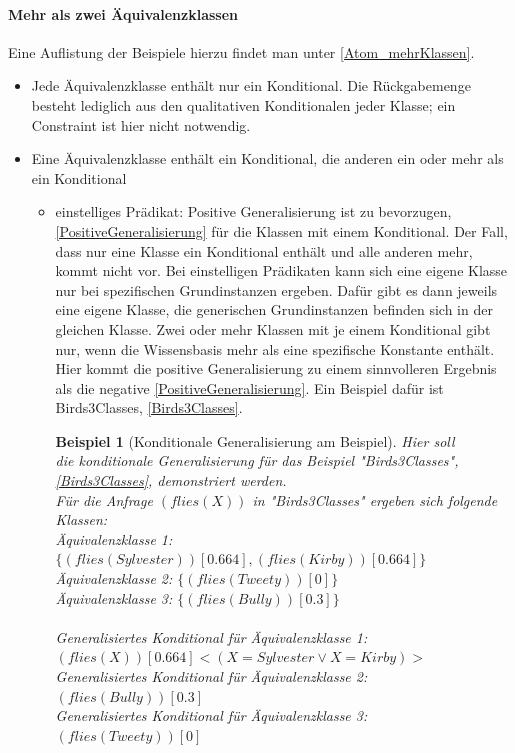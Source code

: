 \documentclass[a4paper, 11pt]{book}
\newtheorem{Bsp}{Beispiel}[section]
\begin{document}
\paragraph{ Mehr als zwei Äquivalenzklassen} 
Eine Auflistung der Beispiele hierzu findet man unter \ref{Atom_mehrKlassen}.\\
\begin{itemize}
	\item Jede Äquivalenzklasse enthält nur ein Konditional. Die Rückgabemenge besteht lediglich aus den qualitativen Konditionalen jeder Klasse; ein Constraint ist hier nicht notwendig.
	\item Eine Äquivalenzklasse enthält ein Konditional, die anderen ein oder mehr als ein Konditional
	\begin{itemize}
		\item einstelliges Prädikat: Positive Generalisierung ist zu bevorzugen, \ref{PositiveGeneralisierung} für die Klassen mit einem Konditional. Der Fall, dass nur eine Klasse ein Konditional enthält und alle anderen mehr, kommt nicht vor. Bei einstelligen Prädikaten kann sich eine eigene Klasse nur bei spezifischen Grundinstanzen ergeben. Dafür gibt es dann jeweils eine eigene Klasse, die generischen Grundinstanzen befinden sich in der gleichen Klasse. Zwei oder mehr Klassen mit je einem Konditional gibt nur, wenn die Wissensbasis mehr als eine spezifische Konstante enthält. Hier kommt die positive Generalisierung zu einem sinnvolleren Ergebnis als die negative \ref{PositiveGeneralisierung}. Ein Beispiel dafür ist Birds3Classes, \ref{Birds3Classes}.\\
		\begin{Bsp}[Konditionale Generalisierung am Beispiel]
		Hier soll \\ die konditionale Generalisierung für das Beispiel "{}Birds3Classes"{}, \ref{Birds3Classes}, demonstriert werden.\\
		Für die Anfrage $ (flies(X)) $ in "{}Birds3Classes"{} ergeben sich folgende Klassen:\\
		
		\noindent
		Äquivalenzklasse 1: $ \{(flies(Sylvester))[0.664], (flies(Kirby))[0.664]\}  $\\
		Äquivalenzklasse 2: $ \{(flies(Tweety))[0]\} $\\
		Äquivalenzklasse 3: $ \{(flies(Bully))[0.3]\} $\\
		\\
		Generalisiertes Konditional für Äquivalenzklasse 1:\\ $ (flies(X))[0.664]<(X = Sylvester \lor  X = Kirby)>$\\
		Generalisiertes Konditional für Äquivalenzklasse 2:\\ $ (flies(Bully))[0.3] $\\
		Generalisiertes Konditional für Äquivalenzklasse 3:\\ $ (flies(Tweety))[0] $\\
	

\end{Bsp}
\end{itemize}
\end{itemize}
\end{document}
